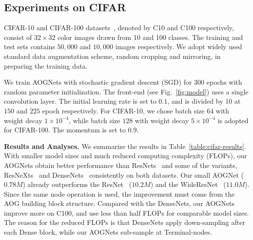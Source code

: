 \documentclass[10pt,twocolumn,letterpaper]{article}
\begin{document}
   
 






    
\subsection{Experiments on CIFAR}
CIFAR-10 and CIFAR-100 datasets~\cite{CIFAR}, denoted by C10 and C100 respectively,  consist of $32\times32$ color images drawn from 10 and 100 classes. The training and test sets contains $50,000$ and $10,000$ images respectively. We adopt widely used standard data augmentation scheme, random cropping and mirroring, in preparing the training data. %

We train AOGNets with stochastic gradient descent (SGD) for $300$ epochs with random parameter initialization. The front-end (see Fig.~\ref{fig:model}) uses a single convolution layer. The initial learning rate is set to $0.1$, and is divided by $10$ at $150$ and $225$ epoch respectively. For CIFAR-10, we chose batch size $64$ with weight decay $1\times10^{-4}$, while batch size $128$ with weight decay $5\times10^{-4}$ is adopted for CIFAR-100. The momentum is set to $0.9$.  

   
\textbf{Results and Analyses.} We summarize the results in Table~\ref{table:cifar-results}. With smaller model sizes and much reduced computing complexity (FLOPs), our AOGNets obtain better performance than ResNets~\cite{ResidualNet} and some of the variants, ResNeXts~\cite{ResNeXt} and DenseNets~\cite{DenseNet} consistently on both datasets. Our small AOGNet ($0.78M$) already outperforms the ResNet~\cite{ResidualNet} ($10.2M$) and the WideResNet~\cite{WideResNet} ($11.0M$). Since the same node operation is used, the improvement must come from the AOG building block structure. Compared with the DenseNets, our AOGNets improve more on C100, and use less than half FLOPs for comparable model sizes. The reason for the reduced FLOPs is that DenseNets apply down-sampling after each Dense block, while our AOGNets sub-sample at Terminal-nodes.  
\end{document}
